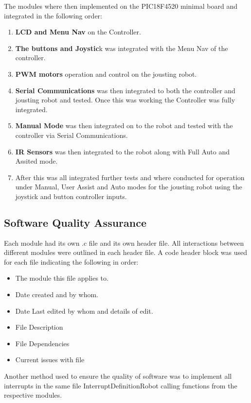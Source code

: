 \documentclass{article}
\begin{document}
The modules where then implemented on the PIC18F4520 minimal board and integrated in the following order:
	\begin{enumerate}
		\item \textbf{LCD and Menu Nav} on the Controller.
		\item \textbf{The buttons and Joystic}k was integrated with the Menu Nav of the controller.
		\item \textbf{PWM motors} operation and control on the jousting robot.
		\item \textbf{Serial Communications} was then integrated to both the controller and jousting robot and tested. Once this was working the Controller was fully integrated.
		\item \textbf{Manual Mode} was then integrated on to the robot and tested with the controller via Serial Communications. 
		\item \textbf{IR Sensors} was then integrated to the robot along with Full Auto and Assited mode.
		\item After this was all integrated further tests and where conducted for operation under Manual, User Assist and Auto modes for the jousting robot using the joystick and button controller inputs.	
	\end{enumerate}

\subsection{Software Quality Assurance}
Each module had its own .c file and its own header file. All interactions between different modules were outlined in each header file.
A code header block was used for each file indicating the following in order:

	\begin{itemize}
		\item The module this file applies to.
		\item Date created and by whom.
		\item Date Last edited by whom and details of edit.
		\item File Description
		\item File Dependencies
		\item Current issues with file
	\end{itemize}
	
Another method used to ensure the quality of software was to implement all interrupts in the same file Interrupt\textunderscore Definition\textunderscore Robot calling functions from the respective modules. 
\end{document}
